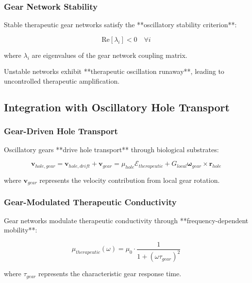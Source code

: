 \documentclass[12pt,a4paper]{article}
\begin{document}
\subsubsection{Gear Network Stability}

Stable therapeutic gear networks satisfy the **oscillatory stability criterion**:

\begin{equation}
\text{Re}[\lambda_i] < 0 \quad \forall i
\end{equation}

where $\lambda_i$ are eigenvalues of the gear network coupling matrix.

Unstable networks exhibit **therapeutic oscillation runaway**, leading to uncontrolled therapeutic amplification.

\subsection{Integration with Oscillatory Hole Transport}

\subsubsection{Gear-Driven Hole Transport}

Oscillatory gears **drive hole transport** through biological substrates:

\begin{equation}
\mathbf{v}_{hole,gear} = \mathbf{v}_{hole,drift} + \mathbf{v}_{gear} = \mu_{hole} \mathcal{E}_{therapeutic} + G_{local} \boldsymbol{\omega}_{gear} \times \mathbf{r}_{hole}
\end{equation}

where $\mathbf{v}_{gear}$ represents the velocity contribution from local gear rotation.

\subsubsection{Gear-Modulated Therapeutic Conductivity}

Gear networks modulate therapeutic conductivity through **frequency-dependent mobility**:

\begin{equation}
\mu_{therapeutic}(\omega) = \mu_0 \cdot \frac{1}{1 + (\omega \tau_{gear})^2}
\end{equation}

where $\tau_{gear}$ represents the characteristic gear response time.
\end{document}
